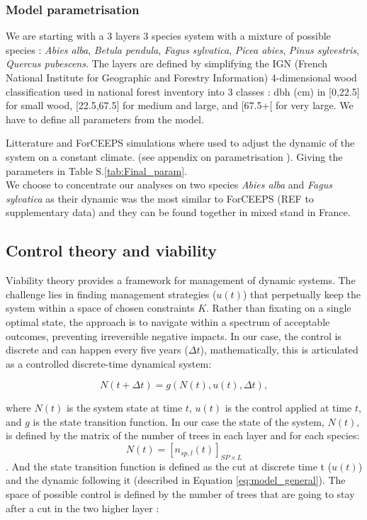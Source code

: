 \documentclass{article}
\begin{document}
\subsubsection{Model parametrisation}

We are starting with a 3 layers 3 species system with a mixture of possible species : \textit{Abies alba}, \textit{Betula pendula}, \textit{Fagus sylvatica}, \textit{Picea abies}, \textit{Pinus sylvestris}, \textit{Quercus pubescens}. The layers are defined by simplifying the IGN (French National Institute for Geographic and Forestry Information) 4-dimensional wood classification used in national forest inventory into 3 classes : dbh (cm) in [0,22.5] for small wood, [22.5,67.5] for medium and large, and [67.5+[ for very large. We have to define all parameters from the model.

Litterature and ForCEEPS simulations where used to adjust the dynamic of the system on a constant climate. (see appendix on parametrisation \autocite{bugmannEcologyMountainousForests1994,morinForestSuccessionGap2021}). Giving the parameters in Table S.\ref{tab:Final_param}.\\
We choose to concentrate our analyses on two species \textit{Abies alba} and \textit{Fagus sylvatica} as their dynamic was the most similar to ForCEEPS (REF to supplementary data) and they can be found together in mixed stand in France.\\

\subsection{Control theory and viability}

Viability theory provides a framework for management of dynamic systems. The challenge lies in finding management strategies (\(u(t)\)) that perpetually keep the system within a space of chosen constraints $K$. Rather than fixating on a single optimal state, the approach is to navigate within a spectrum of acceptable outcomes, preventing irreversible negative impacts.
In our case, the control is discrete and can happen every five years ($\Delta t$), mathematically, this is articulated as a controlled discrete-time dynamical system:

\[
N(t+\Delta t) = g(N(t), u(t), \Delta t),
\]

where \(N(t)\) is the system state at time \(t\), \(u(t)\) is the control applied at time \(t\), and \(g\) is the state transition function. In our case the state of the system, \(N(t)\), is defined by the matrix of the number of trees in each layer and for each species: \[ N(t) = [n_{sp,l}(t)]_{SP \times L} \]. And the state transition function is defined as the cut at discrete time t (\(u(t)\)) and the dynamic following it (described in Equation \eqref{eq:model_general}). The space of possible control is defined by the number of trees that are going to stay after a cut in the two higher layer :
\end{document}
